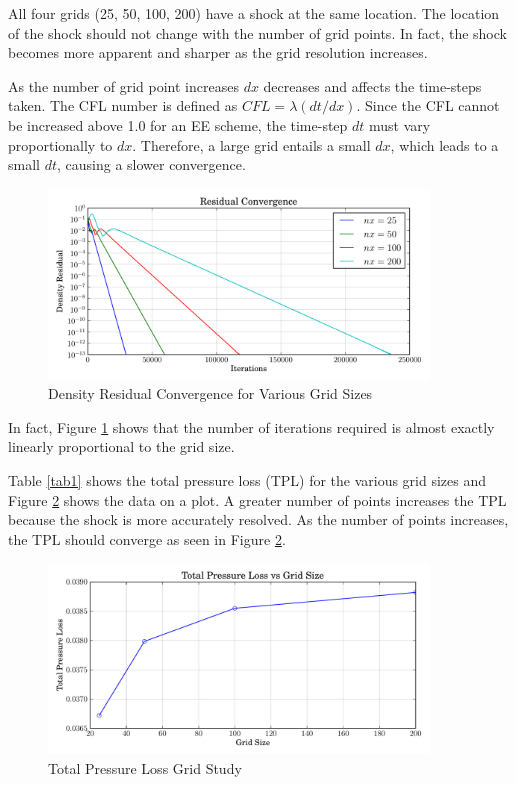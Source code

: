 \documentclass[letterpaper,12pt,]{article}
\begin{document}
All four grids (25, 50, 100, 200) have a shock at the same location.
The location of the shock should not change with the number of grid points.
In fact, the shock becomes more apparent and sharper as the grid resolution increases.

As the number of grid point increases $dx$ decreases and affects the time-steps taken.
The CFL number is defined as $CFL = \lambda(dt/dx)$.
Since the CFL cannot be increased above 1.0 for an EE scheme, the time-step $dt$ must vary proportionally to $dx$.
Therefore, a large grid entails a small $dx$, which leads to a small $dt$, causing a slower convergence.

\begin{figure}[!ht]
    \centering
    \includegraphics[width = 0.9\textwidth]{./figures/q3c.pdf}
    \caption {Density Residual Convergence for Various Grid Sizes}
    \label{fig:q3c}
\end{figure}

In fact, Figure \ref{fig:q3c} shows that the number of iterations required is almost exactly linearly proportional to the grid size.

Table \ref{tab1} shows the total pressure loss (TPL) for the various grid sizes and Figure \ref{fig:q3loss} shows the data on a plot.
A greater number of points increases the TPL because the shock is more accurately resolved.
As the number of points increases, the TPL should converge as seen in Figure \ref{fig:q3loss}.

\begin{figure}[!ht]
    \centering
    \includegraphics[width = 0.9\textwidth]{./figures/q3loss.pdf}
    \caption {Total Pressure Loss Grid Study}
    \label{fig:q3loss}
\end{figure}
\end{document}
